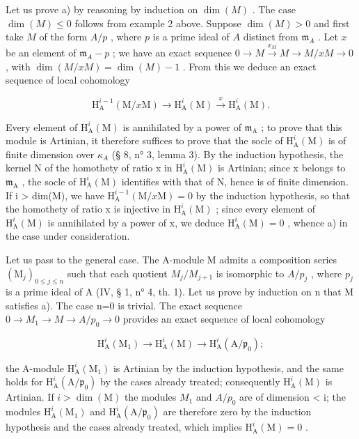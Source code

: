 Let us prove a) by reasoning by induction on \(\dim(M)\) . The case \(\dim(M) \leqslant 0\) follows from example 2 above. Suppose \(\dim(M) > 0\) and first take \(M\) of the form \(A/p\) , where \(p\) is a prime ideal of \(A\) distinct from \(\mathfrak{m}_A\) . Let \(x\) be an element of \(\mathfrak{m}_A - p\) ; we have an exact sequence \(0 \to M \xrightarrow{x_M} M \longrightarrow M/xM \to 0\) , with \(\dim(M/xM) = \dim(M) - 1\) . From this we deduce an exact sequence of local cohomology

\[
\mathrm{H} _ {\mathrm{A}} ^ {i - 1} (\mathrm{M} / x \mathrm{M}) \longrightarrow \mathrm{H} _ {\mathrm{A}} ^ {i} (\mathrm{M}) \stackrel {x} {\longrightarrow} \mathrm{H} _ {\mathrm{A}} ^ {i} (\mathrm{M}).
\]

Every element of \(\mathrm{H}_{\mathrm{A}}^{i}(\mathrm{M})\) is annihilated by a power of \(\mathfrak{m}_{\mathrm{A}}\) ; to prove that this module is Artinian, it therefore suffices to prove that the socle of \(\mathrm{H}_{\mathrm{A}}^{i}(\mathrm{M})\) is of finite dimension over \(\kappa_{A}\) (§ 8, n° 3, lemma 3). By the induction hypothesis, the kernel N of the homothety of ratio x in \(\mathrm{H}_{\mathrm{A}}^{i}(\mathrm{M})\) is Artinian; since x belongs to \(\mathfrak{m}_{\mathrm{A}}\) , the socle of \(\mathrm{H}_{\mathrm{A}}^{i}(\mathrm{M})\) identifies with that of N, hence is of finite dimension. If i > dim(M), we have \(\mathrm{H}_{\mathrm{A}}^{i-1}(\mathrm{M}/x\mathrm{M}) = 0\) by the induction hypothesis, so that the homothety of ratio x is injective in \(\mathrm{H}_{\mathrm{A}}^{i}(\mathrm{M})\) ; since every element of \(\mathrm{H}_{\mathrm{A}}^{i}(\mathrm{M})\) is annihilated by a power of x, we deduce \(\mathrm{H}_{\mathrm{A}}^{i}(\mathrm{M}) = 0\) , whence a) in the case under consideration.

Let us pass to the general case. The A-module M admits a composition series \((\mathrm{M}_{j})_{0\leqslant j\leqslant n}\) such that each quotient \(M_{j}/M_{j+1}\) is isomorphic to \(A/p_{j}\) , where \(p_{j}\) is a prime ideal of A (IV, § 1, n° 4, th. 1). Let us prove by induction on n that M satisfies a). The case n=0 is trivial. The exact sequence \(0\to M_{1}\to M\to A/p_{0}\to0\) provides an exact sequence of local cohomology

\[
\mathrm{H} _ {\mathrm{A}} ^ {i} \left(\mathrm{M} _ {1}\right) \longrightarrow \mathrm{H} _ {\mathrm{A}} ^ {i} (\mathrm{M}) \longrightarrow \mathrm{H} _ {\mathrm{A}} ^ {i} \left(\mathrm{A} / \mathfrak {p} _ {0}\right);
\]

the A-module \(\mathrm{H}_{\mathrm{A}}^{i}(\mathrm{M}_{1})\) is Artinian by the induction hypothesis, and the same holds for \(\mathrm{H}_{\mathrm{A}}^{i}(\mathrm{A}/\mathfrak{p}_{0})\) by the cases already treated; consequently \(\mathrm{H}_{\mathrm{A}}^{i}(\mathrm{M})\) is Artinian. If \(i > \dim(\mathrm{M})\) the modules \(M_{1}\) and \(A/p_{0}\) are of dimension < i; the modules \(\mathrm{H}_{\mathrm{A}}^{i}(\mathrm{M}_{1})\) and \(\mathrm{H}_{\mathrm{A}}^{i}(\mathrm{A}/\mathfrak{p}_{0})\) are therefore zero by the induction hypothesis and the cases already treated, which implies \(\mathrm{H}_{\mathrm{A}}^{i}(\mathrm{M}) = 0\) .

